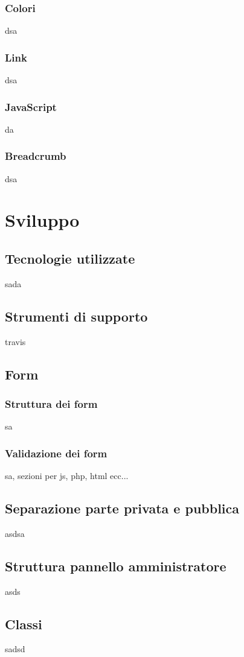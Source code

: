 \documentclass[12pt]{article}
\begin{document}
	\subsubsection{Colori}
	dsa
	\subsubsection{Link}
	dsa
	\subsubsection{JavaScript}
	da
	\subsubsection{Breadcrumb}
	dsa
	

	\section{Sviluppo}
	\subsection{Tecnologie utilizzate}
	sada
	\subsection{Strumenti di supporto}
	travis
	\subsection{Form}
	\subsubsection{Struttura dei form}
	sa
	\subsubsection{Validazione dei form}
	sa, sezioni per js, php, html ecc...
	\subsection{Separazione parte privata e pubblica}
	asdsa
	\subsection{Struttura pannello amministratore}
	asds
	\subsection{Classi}
	sadsd
\end{document}
